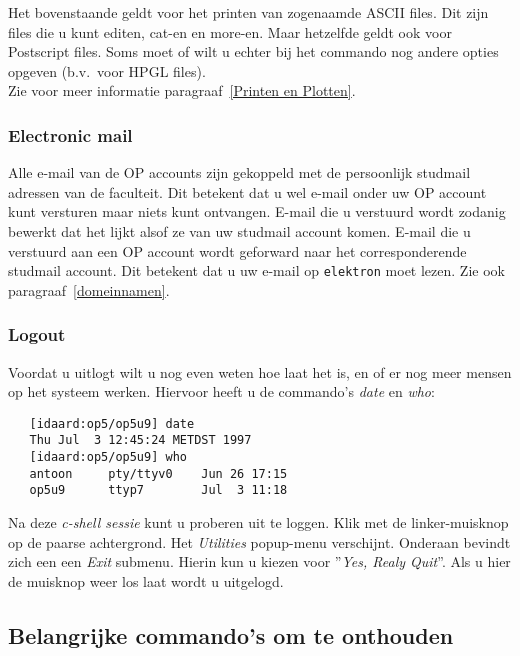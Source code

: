 Het bovenstaande geldt voor het printen van zogenaamde ASCII files.
Dit zijn files die u kunt editen, cat-en en more-en.
Maar hetzelfde geldt ook voor Postscript files.
Soms moet of wilt u echter bij het commando 
nog andere opties opgeven (b.v.\ voor HPGL files).\\
Zie voor meer informatie paragraaf~\ref{Printen en Plotten}.

\subsubsection{Electronic mail}
\label{Electronic mail} 

Alle e-mail van de OP accounts zijn gekoppeld met de persoonlijk
studmail adressen van de faculteit. Dit betekent dat u wel e-mail
onder uw OP account kunt versturen maar niets kunt ontvangen. E-mail
die u verstuurd wordt zodanig bewerkt dat het lijkt alsof ze van uw
studmail account komen. E-mail die u verstuurd aan een OP account
wordt geforward naar het corresponderende studmail account.
Dit betekent dat u uw e-mail op {\tt elektron} moet lezen.
Zie ook paragraaf~\ref{domeinnamen}.

\subsubsection{Logout}
\label{Logout}
Voordat u uitlogt wilt u nog even weten hoe laat het is,
en of er nog meer mensen op het systeem werken.
Hiervoor heeft u de commando's {\em date} en {\em who}\/:
\begin{verbatim}
   [idaard:op5/op5u9] date
   Thu Jul  3 12:45:24 METDST 1997
   [idaard:op5/op5u9] who
   antoon     pty/ttyv0    Jun 26 17:15
   op5u9      ttyp7        Jul  3 11:18
\end{verbatim}

Na deze {\em c-shell sessie} kunt u proberen uit te loggen.
Klik met de linker-muisknop op de paarse achtergrond.
Het {\em Utilities} popup-menu verschijnt.
Onderaan bevindt zich een een {\em Exit} submenu.
Hierin kun u kiezen voor ''{\em Yes, Realy Quit}\/''.
Als u hier de muisknop weer los laat wordt u uitgelogd.

\subsection{Belangrijke commando's om te onthouden}

